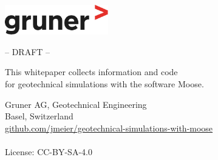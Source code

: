 \begin{titlepage}
    \begin{flushright}
        \includegraphics[width=4.5cm]{img/gruner.pdf}
    \end{flushright}
    \begin{center}
        \vspace*{5cm}

        {\Huge\textbf{\varTitle}}

        \vspace{5cm}

        \large{-- DRAFT --}

        \vfill

        \large{This whitepaper collects information and code \\
            for geotechnical simulations with the software Moose.}

        \vfill

        \textbf{\varAuthor}

        \vspace{0.8cm}

        Gruner AG, Geotechnical Engineering\\
        Basel, Switzerland\\

        \vspace{1cm}
        \href{https://github.com/jmeier/geotechnical-simulations-with-moose}{github.com/jmeier/geotechnical-simulations-with-moose}\\
        \varDate\\

        \vspace{1cm}
        License: CC-BY-SA-4.0

    \end{center}
\end{titlepage}